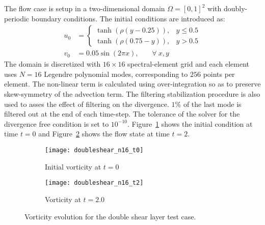 The flow case is setup in a two-dimensional domain $\Omega=[0,1]^{2}$ with doubly-periodic boundary conditions. The initial conditions are introduced as:
\begin{align}
 u_{0} &= 
 \begin{cases}
    	\tanh(\rho(y-0.25)),		& y \leq 0.5 \\
    	\tanh(\rho(0.75-y)),  	& y > 0.5
 \end{cases} \\
 v_{0} &= 0.05\sin(2\pi x),	\hspace{22pt}\forall\ x,y \nonumber
\end{align}
The domain is discretized with $16\times16$ spectral-element grid and each element uses $N=16$ Legendre polynomial modes, corresponding to $256$ points per element. The non-linear term is calculated using over-integration so as to preserve skew-symmetry of the advection term. The filtering stabilization procedure is also used to asses the effect of filtering on the divergence. $1\%$ of the last mode is filtered out at the end of each time-step. The tolerance of the solver for the divergence free condition is set to $10^{-10}$. Figure~\ref{fig:doubleshear_t0} shows the initial condition at time $t=0$ and Figure~\ref{fig:doubleshear_t2} shows the flow state at time $t=2$.

\begin{figure}[h]
	\centering
	\begin{subfigure}[b]{0.45\textwidth}
		\centering
		\texttt{[image: doubleshear\_n16\_t0]}
		\caption{Initial vorticity at $t=0$}
		\label{fig:doubleshear_t0}
	\end{subfigure}
	\begin{subfigure}[b]{0.45\textwidth}
		\centering
		\texttt{[image: doubleshear\_n16\_t2]}
		\caption{Vorticity at $t=2.0$}
		\label{fig:doubleshear_t2}
	\end{subfigure}
	\caption{Vorticity evolution for the double shear layer test case. }
	\label{fig:doubleshear_soln}
\end{figure}

